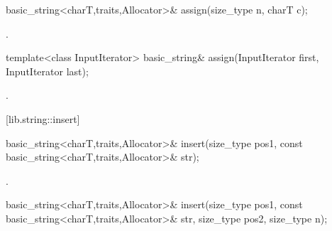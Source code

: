 %
\begin{itemdecl}
basic_string<charT,traits,Allocator>&
  assign(size_type n, charT c);
\end{itemdecl}

\begin{itemdescr}
\pnum
\returns
{}.
\end{itemdescr}

%
%
\begin{itemdecl}
template<class InputIterator>
  basic_string& assign(InputIterator first, InputIterator last);
\end{itemdecl}

\begin{itemdescr}
\pnum
\returns
{}.
\end{itemdescr}

[lib.string::insert]{}

%
%
\begin{itemdecl}
basic_string<charT,traits,Allocator>&
  insert(size_type pos1,
         const basic_string<charT,traits,Allocator>& str);
\end{itemdecl}

\begin{itemdescr}
\pnum
\returns
{}.
\end{itemdescr}

%
%
\begin{itemdecl}
basic_string<charT,traits,Allocator>&
  insert(size_type pos1,
         const basic_string<charT,traits,Allocator>& str,
         size_type pos2, size_type n);
\end{itemdecl}

